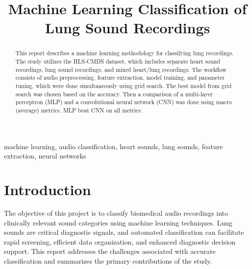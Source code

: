 \documentclass[conference]{IEEEtran}
\begin{document}
\title{Machine Learning Classification of Lung Sound Recordings}

\author{
}

\maketitle

\begin{abstract}
This report describes a machine learning methodology for classifying lung recordings.
The study utilizes the HLS-CMDS dataset, which includes separate heart sound recordings, lung sound recordings, and mixed heart/lung recordings.
The workflow consists of audio preprocessing, feature extraction, model training, and parameter tuning, which were done simultaneously using grid search. The best model from grid search was chosen based on the accuracy. Then a comparison of a multi-layer perceptron (MLP) and a convolutional neural network (CNN) was done using macro (average) metrics. MLP beat CNN on all metrics.
\end{abstract}

\begin{IEEEkeywords}
machine learning, audio classification, heart sounds, lung sounds, feature
extraction, neural networks
\end{IEEEkeywords}

\section{Introduction}
The objective of this project is to classify biomedical audio recordings into clinically relevant sound categories using machine learning techniques. Lung sounds are critical diagnostic signals, and automated classification can facilitate rapid screening, efficient data organization, and enhanced diagnostic decision support. This report addresses the challenges associated with accurate classification and summarizes the primary contributions of the study.
\end{document}
